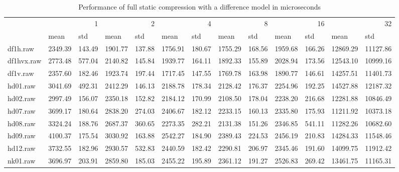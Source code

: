 \begin{table}
\caption{Performance of full static compression with a difference model in microseconds}
\begin{tabular}{lllllllllllll}
 & \multicolumn{2}{r}{1} & \multicolumn{2}{r}{2} & \multicolumn{2}{r}{4} & \multicolumn{2}{r}{8} & \multicolumn{2}{r}{16} & \multicolumn{2}{r}{32} \\
 & mean & std & mean & std & mean & std & mean & std & mean & std & mean & std \\
df1h.raw & 2349.39 & 143.49 & 1901.77 & 137.88 & 1756.91 & 180.67 & 1755.29 & 168.56 & 1959.68 & 166.26 & 12869.29 & 11127.86 \\
df1hvx.raw & 2773.48 & 577.04 & 2140.82 & 145.84 & 1939.77 & 164.11 & 1892.33 & 155.89 & 2028.94 & 173.56 & 12543.10 & 10999.16 \\
df1v.raw & 2357.60 & 182.46 & 1923.74 & 197.44 & 1717.45 & 147.55 & 1769.78 & 163.98 & 1890.77 & 146.61 & 14257.51 & 11401.73 \\
hd01.raw & 3041.69 & 492.31 & 2412.29 & 146.13 & 2188.78 & 178.34 & 2128.42 & 176.37 & 2254.96 & 192.25 & 14527.88 & 12187.32 \\
hd02.raw & 2997.49 & 156.07 & 2350.18 & 152.82 & 2184.12 & 170.99 & 2108.50 & 178.04 & 2238.20 & 216.68 & 12281.88 & 10846.49 \\
hd07.raw & 3699.17 & 180.64 & 2838.20 & 274.03 & 2406.67 & 182.12 & 2233.15 & 160.13 & 2335.80 & 175.93 & 11211.92 & 10373.18 \\
hd08.raw & 3324.24 & 188.76 & 2687.37 & 360.65 & 2273.35 & 282.21 & 2131.38 & 151.26 & 2346.85 & 541.11 & 11282.26 & 10682.60 \\
hd09.raw & 4100.37 & 175.54 & 3030.92 & 163.88 & 2542.27 & 184.90 & 2389.43 & 224.53 & 2456.19 & 210.83 & 14284.33 & 11548.46 \\
hd12.raw & 3732.55 & 182.96 & 2930.57 & 532.83 & 2440.59 & 182.42 & 2290.81 & 206.97 & 2345.46 & 191.60 & 14099.75 & 11912.42 \\
nk01.raw & 3696.97 & 203.91 & 2859.80 & 185.03 & 2455.22 & 195.89 & 2361.12 & 191.27 & 2526.83 & 269.42 & 13461.75 & 11165.31 \\
\end{tabular}
\end{table}

